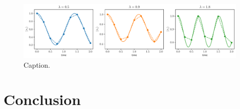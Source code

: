 \documentclass[12pt]{article}
\begin{document}
    \begin{figure}
      \centering
      \includegraphics[width=\textwidth]{images/time-evolution-magnetization-separate-test}
      \caption{Caption.%
              \label{fig:time-evolution-magnetization-separate-test}}
    \end{figure}

  \section{Conclusion}
  \blindtext

  \printbibliography
\end{document}
